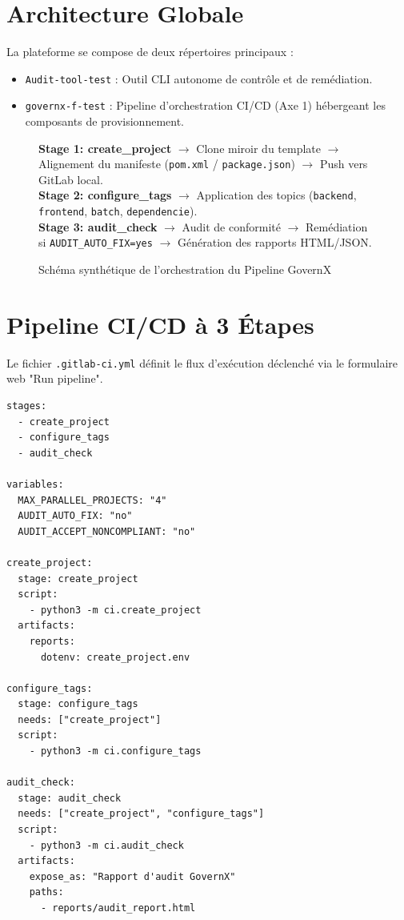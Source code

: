 \documentclass[12pt,a4paper]{report}
\begin{document}
\section{Architecture Globale}
La plateforme se compose de deux répertoires principaux :
\begin{itemize}
    \item \texttt{Audit-tool-test} : Outil CLI autonome de contrôle et de remédiation.
    \item \texttt{governx-f-test} : Pipeline d'orchestration CI/CD (Axe 1) hébergeant les composants de provisionnement.
\end{itemize}

\begin{figure}[htbp]
    \centering
    \begin{tcolorbox}[colback=white,colframe=primaryColor,width=0.9\textwidth,title=Flux du Pipeline CI/CD GovernX]
    \small
    \textbf{Stage 1: create\_project} $\rightarrow$ Clone miroir du template $\rightarrow$ Alignement du manifeste (\texttt{pom.xml} / \texttt{package.json}) $\rightarrow$ Push vers GitLab local.\\[0.2cm]
    \textbf{Stage 2: configure\_tags} $\rightarrow$ Application des topics (\texttt{backend}, \texttt{frontend}, \texttt{batch}, \texttt{dependencie}).\\[0.2cm]
    \textbf{Stage 3: audit\_check} $\rightarrow$ Audit de conformité $\rightarrow$ Remédiation si \texttt{AUDIT\_AUTO\_FIX=yes} $\rightarrow$ Génération des rapports HTML/JSON.
    \end{tcolorbox}
    \caption{Schéma synthétique de l'orchestration du Pipeline GovernX}
    \label{fig:pipeline_flow}
\end{figure}

\section{Pipeline CI/CD à 3 Étapes}
Le fichier \texttt{.gitlab-ci.yml} définit le flux d'exécution déclenché via le formulaire web "Run pipeline".

\begin{lstlisting}[style=YamlStyle, caption={Structure du pipeline GitLab CI GovernX}]
stages:
  - create_project
  - configure_tags
  - audit_check

variables:
  MAX_PARALLEL_PROJECTS: "4"
  AUDIT_AUTO_FIX: "no"
  AUDIT_ACCEPT_NONCOMPLIANT: "no"

create_project:
  stage: create_project
  script:
    - python3 -m ci.create_project
  artifacts:
    reports:
      dotenv: create_project.env

configure_tags:
  stage: configure_tags
  needs: ["create_project"]
  script:
    - python3 -m ci.configure_tags

audit_check:
  stage: audit_check
  needs: ["create_project", "configure_tags"]
  script:
    - python3 -m ci.audit_check
  artifacts:
    expose_as: "Rapport d'audit GovernX"
    paths:
      - reports/audit_report.html
\end{lstlisting}
\end{document}
